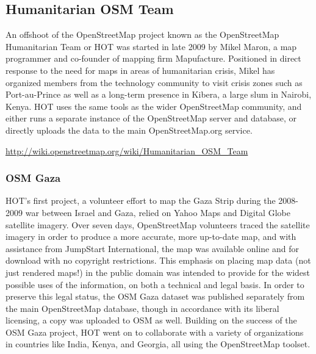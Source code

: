 \documentclass[11pt]{report}
\begin{document}
\subsection{Humanitarian OSM Team}
 
An offshoot of the OpenStreetMap project known as the OpenStreetMap Humanitarian Team or HOT was started in late 2009 by Mikel Maron, a map programmer and co-founder of mapping firm Mapufacture. Positioned in direct response to the need for maps in areas of humanitarian crisis, Mikel has organized members from the technology community to visit crisis zones such as Port-au-Prince as well as a long-term presence in Kibera, a large slum in Nairobi, Kenya. HOT uses the same tools as the wider OpenStreetMap community, and either runs a separate instance of the OpenStreetMap server and database, or directly uploads the data to the main OpenStreetMap.org service. 

\url{http://wiki.openstreetmap.org/wiki/Humanitarian_OSM_Team}

\subsubsection{OSM Gaza}

HOT's first project, a volunteer effort to map the Gaza Strip during the 2008-2009 war between Israel and Gaza, relied on Yahoo Maps and Digital Globe satellite imagery. Over seven days, OpenStreetMap volunteers traced the satellite imagery in order to produce a more accurate, more up-to-date map, and with assistance from JumpStart International, the map was available online and for download with no copyright restrictions. This emphasis on placing map data (not just rendered maps!) in the public domain was intended to provide for the widest possible uses of the information, on both a technical and legal basis. In order to preserve this legal status, the OSM Gaza dataset was published separately from the main OpenStreetMap database, though in accordance with its liberal licensing, a copy was uploaded to OSM as well. Building on the success of the OSM Gaza project, HOT went on to collaborate with a variety of organizations in countries like India, Kenya, and Georgia, all using the OpenStreetMap toolset. 
\end{document}
